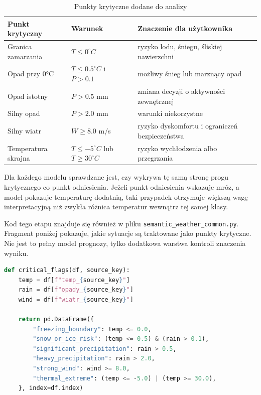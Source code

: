 \documentclass[a4paper,12pt]{article}
\begin{document}
\begin{table}[h]
\centering
\caption{Punkty krytyczne dodane do analizy}
\small
\renewcommand{\arraystretch}{1.15}
\begin{tabularx}{\textwidth}{p{3.0cm}p{3.7cm}X}
\toprule
Punkt krytyczny & Warunek & Znaczenie dla użytkownika \\
\midrule
Granica zamarzania & \(T \leq 0^\circ C\) & ryzyko lodu, śniegu, śliskiej nawierzchni \\
Opad przy 0°C & \(T \leq 0.5^\circ C\) i \(P > 0.1\) & możliwy śnieg lub marznący opad \\
Opad istotny & \(P > 0.5\) mm & zmiana decyzji o aktywności zewnętrznej \\
Silny opad & \(P > 2.0\) mm & warunki niekorzystne \\
Silny wiatr & \(W \geq 8.0\) m/s & ryzyko dyskomfortu i ograniczeń bezpieczeństwa \\
Temperatura skrajna & \(T \leq -5^\circ C\) lub \(T \geq 30^\circ C\) & ryzyko wychłodzenia albo przegrzania \\
\bottomrule
\end{tabularx}
\renewcommand{\arraystretch}{1.0}
\normalsize
\end{table}

Dla każdego modelu sprawdzane jest, czy wykrywa tę samą stronę progu
krytycznego co punkt odniesienia. Jeżeli punkt odniesienia wskazuje mróz, a
model pokazuje temperaturę dodatnią, taki przypadek otrzymuje większą wagę
interpretacyjną niż zwykła różnica temperatur wewnątrz tej samej klasy.

Kod tego etapu znajduje się również w pliku
\texttt{semantic\_weather\_common.py}. Fragment poniżej pokazuje, jakie
sytuacje są traktowane jako punkty krytyczne. Nie jest to pełny model prognozy,
tylko dodatkowa warstwa kontroli znaczenia wyniku.

\begin{lstlisting}[language=Python]
def critical_flags(df, source_key):
    temp = df[f"temp_{source_key}"]
    rain = df[f"opady_{source_key}"]
    wind = df[f"wiatr_{source_key}"]

    return pd.DataFrame({
        "freezing_boundary": temp <= 0.0,
        "snow_or_ice_risk": (temp <= 0.5) & (rain > 0.1),
        "significant_precipitation": rain > 0.5,
        "heavy_precipitation": rain > 2.0,
        "strong_wind": wind >= 8.0,
        "thermal_extreme": (temp <= -5.0) | (temp >= 30.0),
    }, index=df.index)
\end{lstlisting}
\end{document}
